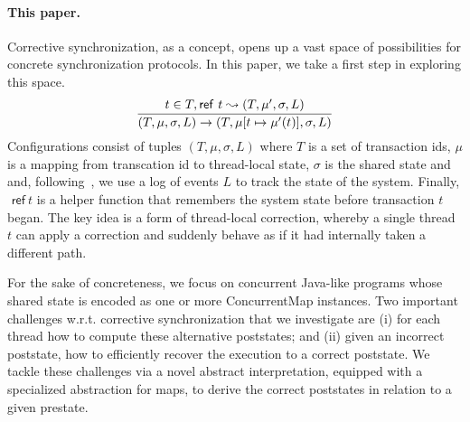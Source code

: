 \paragraph{This paper.} Corrective synchronization, as a concept, opens up a vast space of possibilities for concrete synchronization protocols. In this paper, we take a first step in exploring this space.
%
$$
\infer{(T, \mu, \sigma, L) \rightarrow (T,\mu[t \mapsto \mu'(t)], \sigma, L)}{
	t \in T, 
	{\sf ref}\ t \leadsto (T,\mu', \sigma, L)}
$$
Configurations consist of tuples $(T,\mu,\sigma,L)$ where
$T$ is a set of transaction ids,  $\mu$ is a mapping from
transcation id to thread-local state, $\sigma$ is the shared state and
and, following~\cite{Koskinen15}, we use a log of events $L$ to track the
state of the system.
%
Finally, $\textsf{ ref}\ t$ is a helper function that remembers the
system state before transaction $t$ began.
%
The key idea is a form of thread-local correction, whereby a single
thread $t$ can apply a correction and suddenly behave as if it had
internally taken a different path.
%

For the sake of concreteness, 
we focus on concurrent Java-like programs whose shared state is encoded as one or more {\sf ConcurrentMap} instances.
%
Two important challenges w.r.t. corrective synchronization that we investigate  are (i) for each thread how to compute these alternative poststates; and (ii) given an incorrect poststate, how to efficiently recover the execution to a correct poststate. 
We tackle these challenges via a novel abstract interpretation, equipped with a specialized abstraction for maps, to derive the correct poststates in relation to a given prestate. 



